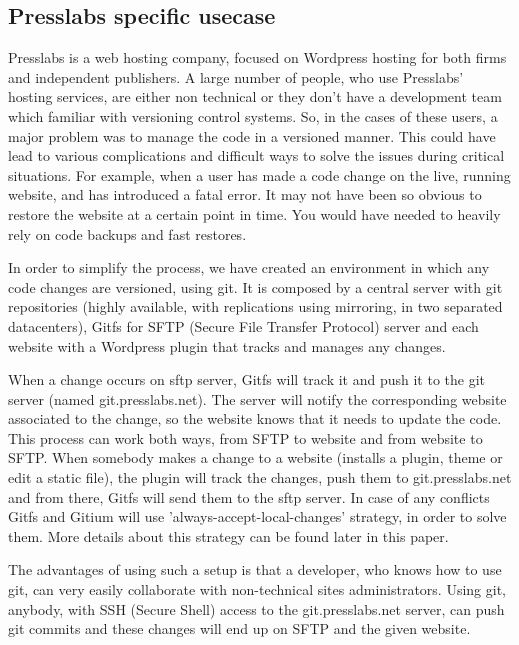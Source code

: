\subsection{Presslabs specific usecase}
Presslabs is a web hosting company, focused on Wordpress hosting for both firms and independent publishers. A large number of people, who use Presslabs' hosting services, are either non technical or they don't have a development team which familiar with versioning control systems. So, in the cases of these users, a major problem was to manage the code in a versioned manner. This could have lead to various complications and difficult ways to solve the issues during critical situations. For example, when a user has made a code change on the live, running website, and has introduced a fatal error. It may not have been so obvious to restore the website at a certain point in time. You would have needed to heavily rely on code backups and fast restores.

In order to simplify the process, we have created an environment in which any code changes are versioned, using git. It is composed by a central server with git repositories (highly available, with replications using mirroring, in two separated datacenters), Gitfs for SFTP (Secure File Transfer Protocol) server and each website with a Wordpress \cite{Wordpress} plugin that tracks and manages any changes.

When a change occurs on sftp server, Gitfs will track it and push it to the git server (named git.presslabs.net). The server will notify the corresponding website associated to the change, so the website knows that it needs to update the code. This process can work both ways, from SFTP to website and from website to SFTP. When somebody makes a change to a website (installs a plugin, theme or edit a static file), the plugin will track the changes, push them to git.presslabs.net and from there, Gitfs will send them to the sftp server. In case of any conflicts Gitfs and Gitium will use 'always-accept-local-changes' strategy, in order to solve them. More details about this strategy can be found later in this paper.

The advantages of using such a setup is that a developer, who knows how to use git, can very easily collaborate with non-technical sites administrators. Using git, anybody, with SSH (Secure Shell) access to the git.presslabs.net server, can push git commits and these changes will end up on SFTP and the given website.